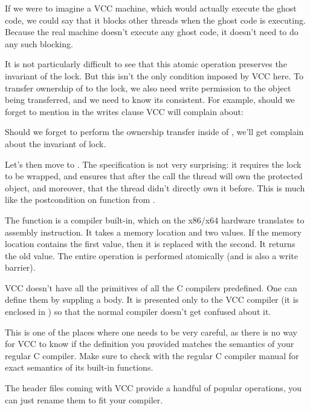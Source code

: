 \begin{note}
If we were to imagine a VCC machine, which would actually execute the 
ghost code, we could say that it blocks other threads when the ghost
code is executing.
Because the real machine doesn't execute any ghost code, it doesn't need to do
any such blocking.
\end{note}

It is not particularly difficult to see that this atomic operation preserves the
invariant of the lock.
But this isn't the only condition imposed by VCC here.
To transfer ownership of  to the lock, we also need
write permission to the object being transferred, and
we need to know its consistent.
For example, should we forget to mention 
in the writes clause VCC will complain about:


\noindent
Should we forget to perform the ownership transfer inside of , we'll get complain
about the invariant of lock.


Let's then move to . 
The specification is not very surprising: it requires the lock to be wrapped,
and ensures that after the call the thread will own the protected object,
and moreover, that the thread didn't directly own it before.
This is much like the postcondition on  function
from .


\noindent
The  function is a compiler built-in,
which on the x86/x64 hardware translates to  assembly instruction.
It takes a memory location and two values.
If the memory location contains the first value, then it is replaced with the second.
It returns the old value.
The entire operation is performed atomically (and is also a write barrier).

\begin{note}
VCC doesn't have all the primitives of all the C compilers predefined.
One can define them by suppling a body.
It is presented only to the VCC compiler (it is enclosed in
) so that the normal compiler doesn't get confused
about it.


\noindent
This is one of the places where one needs to be very careful,
as there is no way for VCC to know if the definition you provided matches
the semantics of your regular C compiler.
Make sure to check with the regular C compiler manual for exact semantics
of its built-in functions.

The header files coming with VCC provide a handful of popular operations,
you can just rename them to fit your compiler. 
\end{note}

